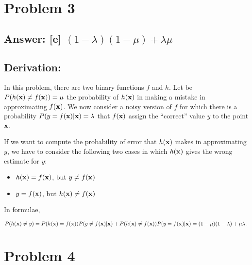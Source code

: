 \documentclass[11pt]{article}
\begin{document}
    \hypertarget{problem-3}{%
\section{Problem 3}\label{problem-3}}

\hypertarget{answer-e-1-lambda1-mulambdamu}{%
\subsection{\texorpdfstring{Answer: {[}e{]}
\((1-\lambda)(1-\mu)+\lambda\mu\)}{Answer: {[}e{]} (1-\textbackslash{}lambda)(1-\textbackslash{}mu)+\textbackslash{}lambda\textbackslash{}mu}}\label{answer-e-1-lambda1-mulambdamu}}

\hypertarget{derivation}{%
\subsection{Derivation:}\label{derivation}}

In this problem, there are two binary functions \(f\) and \(h\). Let be
\(P(h({\bf x})\neq f({\bf x}))=\mu\) the probability of \(h({\bf x})\)
in making a mistake in approximating \(f({\bf x})\). We now consider a
noisy version of \(f\) for which there is a probability
\(P(y = f({\bf x})|{\bf x})=\lambda\) that \(f({\bf x})\) assign the
``correct'' value \(y\) to the point \({\bf x}\).

If we want to compute the probability of error that \(h({\bf x})\) makes
in approximating \(y\), we have to consider the following two cases in
which \(h({\bf x})\) gives the wrong estimate for \(y\):

\begin{itemize}
\item
  \(h({\bf x})=f({\bf x})\), but \(y\neq f({\bf x})\)
\item
  \(y = f({\bf x})\), but \(h({\bf x})\neq f({\bf x})\)
\end{itemize}

In formulae,

\[
P(h({\bf x})\neq y)= P(h({\bf x}) = f({\bf x}))P(y \neq f({\bf x})|{\bf x})+P(h({\bf x})\neq f({\bf x}))P(y = f({\bf x})|{\bf x})\\=(1-\mu)(1-\lambda)+\mu\lambda\,.
\]

    \hypertarget{problem-4}{%
\section{Problem 4}\label{problem-4}}
\end{document}
